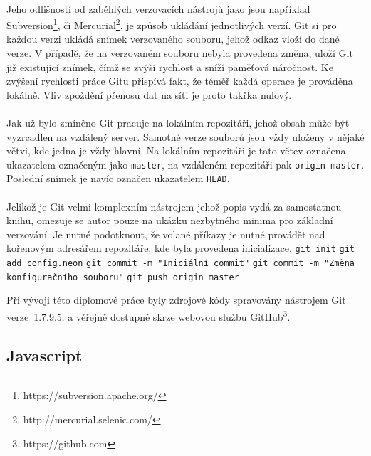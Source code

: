 \documentclass[11pt,oneside]{fithesis}
\begin{document}
        \paragraph*{}
        Jeho odlišností od zaběhlých verzovacích nástrojů jako jsou například Subversion\footnote{https://subversion.apache.org/}, či Mercurial\footnote{http://mercurial.selenic.com/}, je způsob ukládání jednotlivých verzí. Git si pro každou verzi ukládá snímek verzovaného souboru, jehož odkaz vloží do dané verze. V případě, že na verzovaném souboru nebyla provedena změna, uloží Git již existující znímek, čímž se zvýší rychlost a sníží paměťová náročnost. Ke zvýšení rychlosti práce Gitu přispívá fakt, že téměř každá operace je prováděna lokálně. Vliv zpoždění přenosu dat na síti je proto takřka nulový.
        \paragraph*{}
        Jak už bylo zmíněno Git pracuje na lokálním repozitáři, jehož obsah může být vyzrcadlen na vzdálený server. Samotné verze souborů jsou vždy uloženy v nějaké větvi, kde jedna je vždy hlavní. Na lokálním repozitáři je tato větev označena ukazatelem označeným jako \verb|master|, na vzdáleném repozitáři pak \verb|origin master|. Poslední snímek je navíc označen ukazatelem \verb|HEAD|.
        \paragraph*{}
        Jelikož je Git velmi komplexním nástrojem jehož popis vydá za samostatnou knihu\cite{progit}, omezuje se autor pouze na ukázku nezbytného minima pro základní verzování. Je nutné podotknout, že volané příkazy je nutné provádět nad kořenovým adresářem repozitáře, kde byla provedena inicializace.
        \noindent
        \verb|git init|
        \newline\verb|git add config.neon|
        \newline\verb|git commit -m "Iniciální commit"| 
        \newline\verb|git commit -m "Změna konfiguračního souboru"|
        \newline\verb|git push origin master|
        \newline

        Při vývoji této diplomové práce byly zdrojové kódy spravovány nástrojem Git verze~1.7.9.5. a věřejně dostupné skrze webovou službu GitHub\footnote{https://github.com}.

        \subsection{Javascript}
\end{document}
